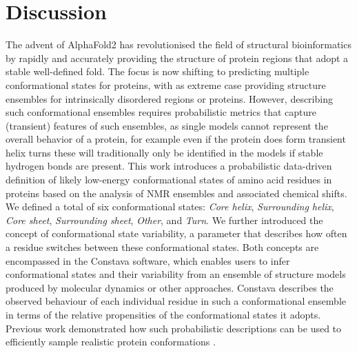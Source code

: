 \section{Discussion}
The advent of AlphaFold2 has revolutionised the field of structural bioinformatics by rapidly and accurately providing the structure of protein regions that adopt a stable well-defined fold. The focus is now shifting to predicting multiple conformational states for proteins, with as extreme case providing structure ensembles for intrinsically disordered regions or proteins. However, describing such conformational ensembles requires probabilistic metrics that capture (transient) features of such ensembles, as single models cannot represent the overall behavior of a protein, for example even if the protein does form transient helix turns these will traditionally only be identified in the models if stable hydrogen bonds are present. This work introduces a probabilistic data-driven definition of likely low-energy conformational states of amino acid residues in proteins based on the analysis of NMR ensembles and associated chemical shifts. We defined a total of six conformational states: \textit{Core helix}, \textit{Surrounding helix}, \textit{Core sheet}, \textit{Surrounding sheet}, \textit{Other}, and \textit{Turn}. We further introduced the concept of conformational state variability, a parameter that describes how often a residue switches between these conformational states. Both concepts are encompassed in the Constava software, which enables users to infer conformational states and their variability from an ensemble of structure models produced by molecular dynamics or other approaches. Constava describes the observed behaviour of each individual residue in such a conformational ensemble in terms of the relative propensities of the conformational states it adopts. Previous work demonstrated how such probabilistic descriptions can be used to efficiently sample realistic protein conformations \cite{hamelryck_sampling_2006}. 

